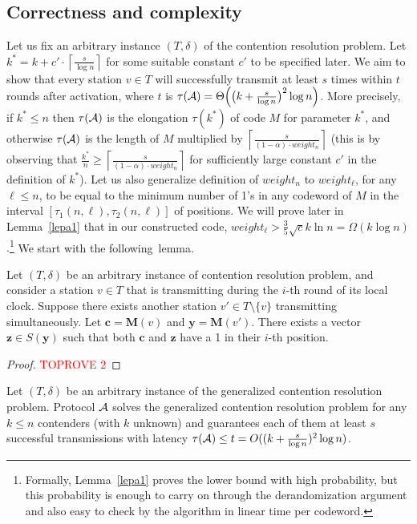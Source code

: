 \documentclass[11pt]{article}
\begin{document}
\subsection{Correctness and complexity}

Let us fix an arbitrary instance $(T, \delta)$ of the contention resolution problem.
{Let 
$k^*=k+c'\cdot \left\lceil\frac{s}{\log n}\right\rceil$
for some suitable constant $c'$ to be specified later.}
We aim to show that every station $v \in T$ will successfully transmit {at least $s$ times} within $t$ rounds after activation, 
where $t$ is {
$\tau({\cal A})=\Theta\Big(\big(k+\frac{s}{\log n}\big)^2\log n\Big)$. More precisely, if $k^*\le n$ then $\tau({\cal A})$ is the elongation $\tau(k^*)$ of code $M$ for parameter $k^*$, and otherwise $\tau({\cal A})$ is the length of $M$ multiplied by $\left\lceil\frac{s}{(1-\alpha)\cdot weight_n}\right\rceil
$ (this is by observing that $\frac{k^*}{n}\ge \left\lceil\frac{s}{(1-\alpha)\cdot weight_n}\right\rceil$ for sufficiently large constant $c'$ in the definition of $k^*$). Let us also generalize definition of $weight_n$ to $weight_{\ell}$, for any $\ell\le n$, to be equal to the minimum number of 1's in any codeword of $M$ in the interval $[\tau_1(n,\ell),\tau_2(n,\ell)]$ of positions. We will prove later in Lemma~\ref{lepa1} that in our constructed code, $weight_{\ell}>\frac{3}{5}\sqrt{c}k\ln n = \Omega(k\log n)$.\footnote{{Formally, Lemma~\ref{lepa1} proves the lower bound with high probability, but this probability is enough to carry on through the derandomization argument and also easy to check by the algorithm in linear time per codeword.}}}
We start with the following~lemma.


\begin{lemma}\label{l:collision}
	Let $(T, \delta)$ be an arbitrary instance of contention resolution problem, and consider a station $v \in T$ that is transmitting during the $i$-th round of its local clock.
	Suppose there exists another station $v' \in T\setminus \{v\}$ transmitting simultaneously.
	Let $\mathbf{c} = \mathbf{M}(v)$ and $\mathbf{y} = \mathbf{M}(v')$. There exists a vector $\mathbf{z} \in S(\mathbf{y})$ such that both $\mathbf{c}$ and $\mathbf{z}$ have a 1 in their $i$-th position.
\end{lemma}

\begin{proof}\textcolor{red}{TOPROVE 2}\end{proof}

\begin{theorem}
\label{thm:codes-vs-CR}
Let $(T, \delta)$ be an arbitrary instance of the generalized contention resolution problem. 
Protocol ${\cal A}$ solves the generalized contention resolution problem for any $k\le n$ contenders (with $k$ unknown) and guarantees each of them at least $s$ successful transmissions 
with latency {$\tau({\cal A}) \leq t = O((k+\frac{s}{\log n})^2\log n)$.}
\end{theorem}
\end{document}

